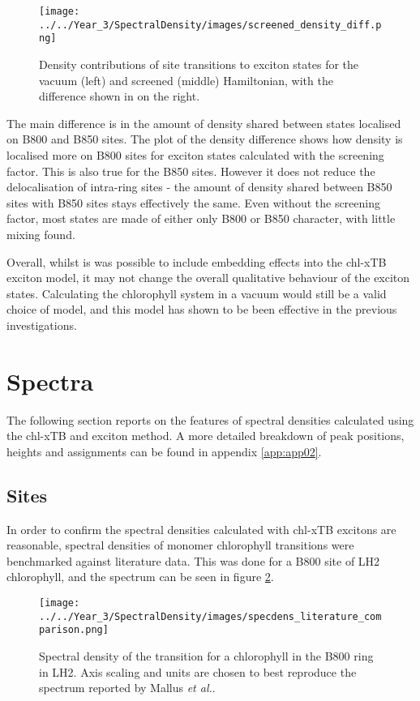 \begin{figure}
    \centering
    \texttt{[image: ../../Year\_3/SpectralDensity/images/screened\_density\_diff.png]}
    \label{fig:LH2_density}
    \caption{Density contributions of site transitions to exciton states for the
    vacuum (left) and screened (middle) Hamiltonian, with the difference shown in
    on the right.}
\end{figure}

The main difference is in the amount of density shared between states localised 
on B800 and B850 sites. The plot of the density difference shows how density is 
localised more on B800 sites for exciton states calculated with the screening
factor. This is also true for the B850 sites. However it does not reduce the delocalisation
of intra-ring sites - the amount of density shared between B850 sites with B850 
sites stays effectively the same. Even without the screening factor, most states
are made of either only B800 or B850 character, with little mixing found.

Overall, whilst is was possible to include embedding effects into the chl-xTB exciton
model, it may not change the overall qualitative behaviour of the exciton states.
Calculating the chlorophyll system in a vacuum would still be a valid choice of
model, and this model has shown to be been effective in the previous investigations.

\section{Spectra}
\label{sec:sites_states_couplings}

The following section reports on the features of spectral densities calculated using
the chl-xTB and exciton method. A more detailed breakdown of peak positions, heights
and assignments can be found in appendix \ref{app:app02}.

\subsection{Sites}
\label{subsec:sites}

In order to confirm the spectral densities calculated with chl-xTB excitons are 
reasonable, spectral densities of monomer chlorophyll \Qy transitions were benchmarked 
against literature data. This was done for a B800 site of LH2 chlorophyll, and the
spectrum can be seen in figure \ref{fig:specdens_lit}.

\begin{figure}
    \centering
    \texttt{[image: ../../Year\_3/SpectralDensity/images/specdens\_literature\_comparison.png]}
    \label{fig:specdens_lit}
    \caption{Spectral density of the \Qy transition for a chlorophyll in the B800
    ring in LH2. Axis scaling and units are chosen to best reproduce the spectrum
    reported by Mallus \emph{et al.}\cite{Mallus2018}.}
\end{figure}

